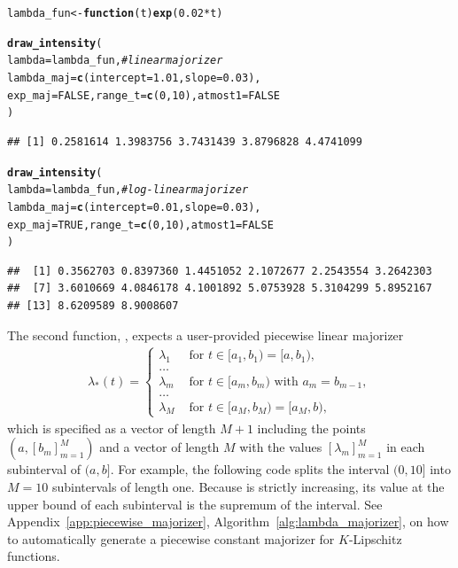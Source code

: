 \documentclass[article,nojss]{jss}\usepackage[]{graphicx}\usepackage[]{xcolor}
\makeatletter
\newcommand{\hlnum}[1]{\textcolor[rgb]{0.686,0.059,0.569}{#1}}%
\newcommand{\hlcom}[1]{\textcolor[rgb]{0.678,0.584,0.686}{\textit{#1}}}%
\newcommand{\hlopt}[1]{\textcolor[rgb]{0,0,0}{#1}}%
\newcommand{\hlstd}[1]{\textcolor[rgb]{0.345,0.345,0.345}{#1}}%
\newcommand{\hlkwa}[1]{\textcolor[rgb]{0.161,0.373,0.58}{\textbf{#1}}}%
\newcommand{\hlkwb}[1]{\textcolor[rgb]{0.69,0.353,0.396}{#1}}%
\newcommand{\hlkwc}[1]{\textcolor[rgb]{0.333,0.667,0.333}{#1}}%
\newcommand{\hlkwd}[1]{\textcolor[rgb]{0.737,0.353,0.396}{\textbf{#1}}}%
\newenvironment{kframe}{%
 \def\at@end@of@kframe{}%
 \ifinner\ifhmode%
  \def\at@end@of@kframe{\end{minipage}}%
  \begin{minipage}{\columnwidth}%
 \fi\fi%
 \def\FrameCommand##1{\hskip\@totalleftmargin \hskip-\fboxsep
 \colorbox{shadecolor}{##1}\hskip-\fboxsep
     \hskip-\linewidth \hskip-\@totalleftmargin \hskip\columnwidth}%
 \MakeFramed {\advance\hsize-\width
   \@totalleftmargin\z@ \linewidth\hsize
   \@setminipage}}%
 {\par\unskip\endMakeFramed%
 \at@end@of@kframe}
\newenvironment{knitrout}{}{} %
\newcommand{\fct}[1]{\code{#1()}}
\makeatother
\begin{document}
\begin{knitrout}
\color{fgcolor}\begin{kframe}
\begin{alltt}
\hlstd{lambda_fun} \hlkwb{<-} \hlkwa{function}\hlstd{(}\hlkwc{t}\hlstd{)} \hlkwd{exp}\hlstd{(}\hlnum{0.02} \hlopt{*} \hlstd{t)}

\hlkwd{draw_intensity}\hlstd{(}
  \hlkwc{lambda} \hlstd{= lambda_fun,} \hlcom{# linear majorizer}
  \hlkwc{lambda_maj} \hlstd{=} \hlkwd{c}\hlstd{(}\hlkwc{intercept} \hlstd{=} \hlnum{1.01}\hlstd{,} \hlkwc{slope} \hlstd{=} \hlnum{0.03}\hlstd{),}
  \hlkwc{exp_maj} \hlstd{=} \hlnum{FALSE}\hlstd{,} \hlkwc{range_t} \hlstd{=} \hlkwd{c}\hlstd{(}\hlnum{0}\hlstd{,} \hlnum{10}\hlstd{),} \hlkwc{atmost1} \hlstd{=} \hlnum{FALSE}
\hlstd{)}
\end{alltt}
\begin{verbatim}
## [1] 0.2581614 1.3983756 3.7431439 3.8796828 4.4741099
\end{verbatim}
\begin{alltt}
\hlkwd{draw_intensity}\hlstd{(}
  \hlkwc{lambda} \hlstd{= lambda_fun,} \hlcom{# log-linear majorizer}
  \hlkwc{lambda_maj} \hlstd{=} \hlkwd{c}\hlstd{(}\hlkwc{intercept} \hlstd{=} \hlnum{0.01}\hlstd{,} \hlkwc{slope} \hlstd{=} \hlnum{0.03}\hlstd{),}
  \hlkwc{exp_maj} \hlstd{=} \hlnum{TRUE}\hlstd{,} \hlkwc{range_t} \hlstd{=} \hlkwd{c}\hlstd{(}\hlnum{0}\hlstd{,} \hlnum{10}\hlstd{),} \hlkwc{atmost1} \hlstd{=} \hlnum{FALSE}
\hlstd{)}
\end{alltt}
\begin{verbatim}
##  [1] 0.3562703 0.8397360 1.4451052 2.1072677 2.2543554 3.2642303
##  [7] 3.6010669 4.0846178 4.1001892 5.0753928 5.3104299 5.8952167
## [13] 8.6209589 8.9008607
\end{verbatim}
\end{kframe}
\end{knitrout}


The second function, \fct{draw\_intensity\_step}, expects a user-provided piecewise linear majorizer
\begin{align*}
    \lambda_*(t) = \begin{cases}
    \lambda_1 &\textrm{ for } t \in [a_1, b_1) = [a, b_1), \\
    \dots &\\
    \lambda_m &\textrm{ for } t \in [a_m, b_m) \textrm{ with } a_{m} = b_{m-1}, \\
    \dots &\\
    \lambda_M &\textrm{ for } t \in [a_M, b_M) = [a_M, b),
    \end{cases}
\end{align*}
which is specified as a vector of length $M+1$ including the points $(a, [b_m]_{m=1}^M)$ and a vector of length $M$ with the values $[\lambda_m]_{m=1}^M$ in each subinterval of $(a, b]$. For example, the following code splits the interval $(0, 10]$ into $M=10$ subintervals of length one. Because \fct{lambda\_fun} is strictly increasing, its value at the upper bound of each subinterval is the supremum of the interval. See Appendix~\ref{app:piecewise_majorizer}, Algorithm~\ref{alg:lambda_majorizer}, on how to automatically generate a piecewise constant majorizer for $K$-Lipschitz functions.
\end{document}

